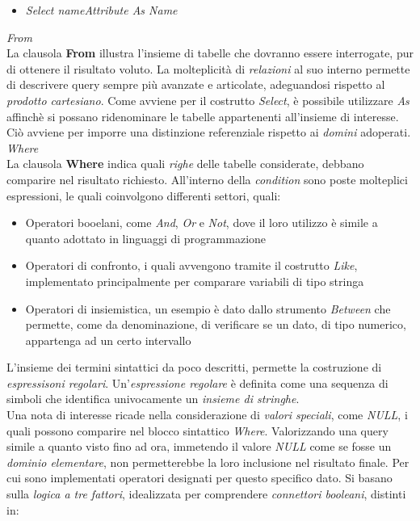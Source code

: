 \documentclass{article}
\begin{document}
\begin{itemize}[label={ }, leftmargin=1cm]
    \item \textit{Select nameAttribute As Name}
\end{itemize} 
\textit{From}\\
La clausola \textbf{From} illustra l'insieme di tabelle che dovranno essere interrogate, pur di ottenere il risultato voluto. La molteplicità di \textit{relazioni} al suo interno permette di descrivere query sempre più avanzate e articolate, adeguandosi rispetto al \textit{prodotto cartesiano}. Come avviene per il costrutto \textit{Select}, è possibile utilizzare \textit{As} affinchè si possano ridenominare le tabelle appartenenti all'insieme di interesse. Ciò avviene per imporre una distinzione referenziale rispetto ai \textit{domini} adoperati.\vspace*{14pt}\\
\textit{Where}\\
La clausola \textbf{Where} indica quali \textit{righe} delle tabelle considerate, debbano comparire nel risultato richiesto. All'interno della \textit{condition} sono poste molteplici espressioni, le quali coinvolgono differenti settori, quali:
\begin{itemize}[label={-}, leftmargin=1cm]
    \itemsep0em
    \item Operatori booelani, come \textit{And}, \textit{Or} e \textit{Not}, dove il loro utilizzo è simile a quanto adottato in linguaggi di programmazione
    \item Operatori di confronto, i quali avvengono tramite il costrutto \textit{Like}, implementato principalmente per comparare variabili di tipo stringa
    \item Operatori di insiemistica, un esempio è dato dallo strumento \textit{Between} che permette, come da denominazione, di verificare se un dato, di tipo numerico, appartenga ad un certo intervallo
\end{itemize}
L'insieme dei termini sintattici da poco descritti, permette la costruzione di \textit{espressisoni regolari}. Un'\textit{espressione regolare} è definita come una sequenza di simboli che identifica univocamente un \textit{insieme di stringhe}.\vspace*{14pt}\\
Una nota di interesse ricade nella considerazione di \textit{valori speciali}, come \textit{NULL}, i quali possono comparire nel blocco sintattico \textit{Where}. Valorizzando una query simile a quanto visto fino ad ora, immetendo il valore \textit{NULL} come se fosse un \textit{dominio elementare}, non permetterebbe la loro inclusione nel risultato finale. Per cui sono implementati operatori designati per questo specifico dato. Si basano sulla \textit{logica a tre fattori}, idealizzata per comprendere \textit{connettori booleani}, distinti in:
\end{document}
